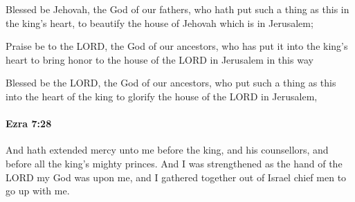 			\begin{versebox}
					\item[BHS] 
					\item[LXX] 
					\item[ASV] Blessed be Jehovah, the God of our fathers, who hath put such a thing as this in the king's heart, to beautify the house of Jehovah which is in Jerusalem;
					\item[NIV] Praise be to the LORD, the God of our ancestors, who has put it into the king’s heart to bring honor to the house of the LORD in Jerusalem in this way
					\item[NRSV] Blessed be the LORD, the God of our ancestors, who put such a thing as this into the heart of the king to glorify the house of the LORD in Jerusalem,
			\end{versebox}

		\paragraph{Ezra 7:28} %
			\label{EZRA-7-28}

			And hath extended mercy unto me before the king, and his counsellors, and before all the king’s mighty princes. And I was strengthened as the hand of the LORD my God was upon me, and I gathered together out of Israel chief men to go up with me.

